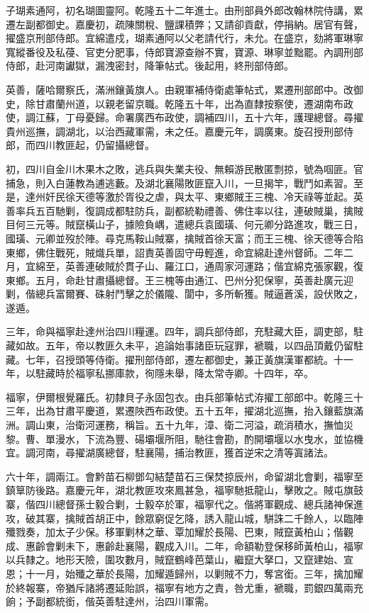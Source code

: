\begin{pinyinscope}
子瑚素通阿，初名瑚圖靈阿。乾隆五十二年進士。由刑部員外郎改翰林院侍講，累遷左副都御史。嘉慶初，疏陳關稅、鹽課積弊；又請卻貢獻，停捐納。居官有聲，擢盛京刑部侍郎。宜綿遣戍，瑚素通阿以父老請代行，未允。在盛京，劾將軍琳寧寬縱番役及私葠、官吏分肥事，侍郎寶源查辦不實，寶源、琳寧並黜罷。內調刑部侍郎，赴河南讞獄，漏洩密封，降筆帖式。後起用，終刑部侍郎。

英善，薩哈爾察氏，滿洲鑲黃旗人。由親軍補侍衛處筆帖式，累遷刑部郎中。改御史，除甘肅蘭州道，以親老留京職。乾隆五十年，出為直隸按察使，遷湖南布政使，調江蘇，丁母憂歸。命署廣西布政使，調補四川，五十六年，護理總督。尋擢貴州巡撫，調湖北，以治西藏軍需，未之任。嘉慶元年，調廣東。旋召授刑部侍郎，而四川教匪起，仍留攝總督。

初，四川自金川木果木之敗，逃兵與失業夫役、無賴游民散匿剽掠，號為啯匪。官捕急，則入白蓮教為逋逃藪。及湖北襄陽敗匪竄入川，一旦揭竿，戰鬥如素習。至是，達州奸民徐天德等激於胥役之虐，與太平、東鄉賊王三槐、冷天祿等並起。英善率兵五百馳剿，復調成都駐防兵，副都統勒禮善、佛住率以往，連破賊巢，擒賊目何三元等。賊竄橫山子，據險負嵎，遣總兵袁國璜、何元卿分路進攻，戰三日，國璜、元卿並歿於陣。尋克馬鞍山賊寨，擒賊首徐天富；而王三槐、徐天德等合陷東鄉，佛住戰死，賊熾兵單，詔責英善固守毋輕進，命宜綿赴達州督師。二年二月，宜綿至，英善連破賊於貫子山、羅江口，通周家河運路；偕宜綿克張家觀，復東鄉。五月，命赴甘肅攝總督。王三槐等由通江、巴州分犯保寧，英善赴廣元迎剿，偕總兵富爾賽、硃射鬥擊之於儀隴、閬中，多所斬獲。賊逼蒼溪，設伏敗之，遂遁。

三年，命與福寧赴達州治四川糧運。四年，調兵部侍郎，充駐藏大臣，調吏部，駐藏如故。五年，帝以教匪久未平，追論始事諸臣玩寇罪，褫職，以四品頂戴仍留駐藏。七年，召授頭等侍衛。擢刑部侍郎，遷左都御史，兼正黃旗漢軍都統。十一年，以駐藏時於福寧私挪庫款，徇隱未舉，降太常寺卿。十四年，卒。

福寧，伊爾根覺羅氏。初隸貝子永固包衣。由兵部筆帖式洊擢工部郎中。乾隆三十三年，出為甘肅平慶道，累遷陜西布政使。五十五年，擢湖北巡撫，抬入鑲藍旗滿洲。調山東，治衛河運務，稱旨。五十九年，漳、衛二河溢，疏消積水，撫恤災黎。曹、單漫水，下流為豐、碭壩堰所阻，馳往會勘，酌開壩堰以水曳水，並協機宜。調河南，尋擢湖廣總督，駐襄陽，捕治教匪，獲首逆宋之清等寘諸法。

六十年，調兩江。會黔苗石柳鄧勾結楚苗石三保焚掠辰州，命留湖北會剿，福寧至鎮筸防後路。嘉慶元年，湖北教匪攻來鳳甚急，福寧馳抵龍山，擊敗之。賊屯旗鼓寨，偕四川總督孫士毅合剿，士毅卒於軍，福寧代之。偕將軍觀成、總兵諸神保進攻，破其寨，擒賊首胡正中，餘眾窮促乞降，誘入龍山城，駢誅二千餘人，以臨陣殲戮奏，加太子少保。移軍剿林之華、覃加耀於長陽、巴東，賊竄黃柏山；偕觀成、惠齡會剿未下，惠齡赴襄陽，觀成入川。二年，命額勒登保移師黃柏山，福寧以兵隸之。地形天險，圍攻數月，賊竄鶴峰芭葉山，繼竄大拏口，又竄建始、宣恩；十一月，始殲之華於長陽，加耀遁歸州，以剿賊不力，奪宮銜。三年，擒加耀於終報寨，帝猶斥諸將遷延貽誤，福寧有地方之責，咎尤重，褫職，罰銀四萬兩充餉；予副都統銜，偕英善駐達州，治四川軍需。


\end{pinyinscope}
